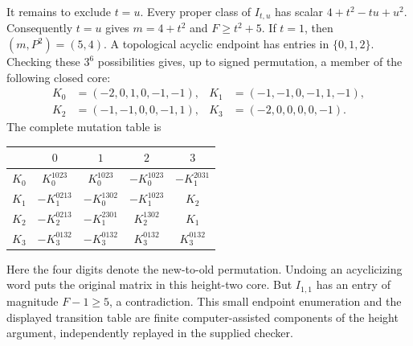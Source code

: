 It remains to exclude $t=u$. Every proper class of $I_{t,u}$ has scalar $4+t^2-tu+u^2$. Consequently $t=u$ gives $m=4+t^2$ and $F\ge t^2+5$.
If $t=1$, then $(m,P^2)=(5,4)$. A topological acyclic endpoint has entries in $\{0,1,2\}$. Checking these $3^6$ possibilities gives, up to signed permutation, a member of the following closed core:
\begin{align*}
 K_0&=(-2,0,1,0,-1,-1),& K_1&=(-1,-1,0,-1,1,-1),\\
 K_2&=(-1,-1,0,0,-1,1),& K_3&=(-2,0,0,0,0,-1).
\end{align*}
The complete mutation table is
\begin{center}\begin{tabular}{c|cccc}\toprule
&$0$&$1$&$2$&$3$\\\midrule
$K_0$&$K_0^{1023}$&$K_0^{1023}$&$-K_0^{1023}$&$-K_1^{2031}$\\
$K_1$&$-K_1^{0213}$&$-K_0^{1302}$&$-K_1^{1023}$&$K_2$\\
$K_2$&$-K_2^{0213}$&$-K_1^{2301}$&$K_2^{1302}$&$K_1$\\
$K_3$&$-K_3^{0132}$&$-K_3^{0132}$&$K_3^{0132}$&$K_3^{0132}$\\\bottomrule
\end{tabular}\end{center}
Here the four digits denote the new-to-old permutation. Undoing an acyclicizing word puts the original matrix in this height-two core. But $I_{1,1}$ has an entry of magnitude $F-1\ge5$, a contradiction. This small endpoint enumeration and the displayed transition table are finite computer-assisted components of the height argument, independently replayed in the supplied checker.

